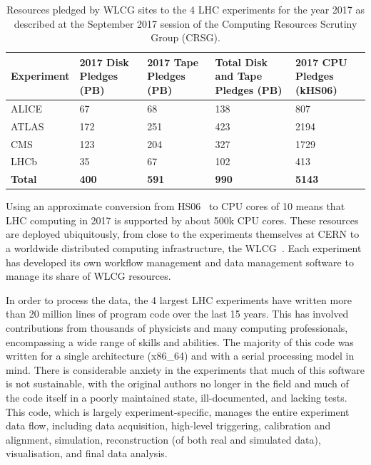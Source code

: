 \begin{table}
    \centering
\begin{tabular}{lp{}p{}p{}p{}}
\hline
\textbf{Experiment} & \textbf{2017 Disk Pledges (PB)} & \textbf{2017 Tape Pledges (PB)} & \textbf{Total Disk and Tape Pledges (PB)} & \textbf{2017 CPU Pledges (kHS06)}\\
\hline
ALICE & 67 & 68 & 138 & 807\\
ATLAS & 172 & 251 & 423 & 2194\\
CMS & 123 & 204 & 327 & 1729\\
LHCb & 35 & 67 & 102 & 413\\
\textbf{Total} & \textbf{400} & \textbf{591} & \textbf{990} &
\textbf{5143}\\
\hline
\end{tabular}
    \caption{Resources pledged by WLCG sites to the 4 LHC experiments for
the year 2017 as described at the September 2017 session of the
Computing Resources Scrutiny Group (CRSG).}
    \label{tab:crsg2017}
\end{table}

Using an approximate conversion from HS06~\cite{HS06} to CPU cores of 10
means that LHC computing in 2017 is supported by about 500k CPU cores.
These resources are deployed ubiquitously, from close to the experiments
themselves at CERN to a worldwide distributed computing infrastructure,
the WLCG~\cite{WLCG}. Each experiment has developed its own workflow management and
data management software to manage its share of WLCG resources.

In order to process the data, the 4 largest LHC experiments have written
more than 20 million lines of program code over the last 15 years. This
has involved contributions from thousands of physicists and many
computing professionals, encompassing a wide range of skills and
abilities. The majority of this code was written for a single
architecture (x86\_64) and with a serial processing model in mind. There
is considerable anxiety in the experiments that much of this software is
not sustainable, with the original authors no longer in the field and
much of the code itself in a poorly maintained state, ill-documented, and
lacking tests. This code, which is largely experiment-specific, manages
the entire experiment data flow, including data acquisition, high-level
triggering, calibration and alignment, simulation, reconstruction (of
both real and simulated data), visualisation, and final data analysis.

